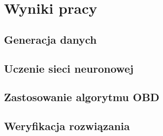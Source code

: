 \newpage %
\section{Wyniki pracy}

\subsection{Generacja danych}
\subsection{Uczenie sieci neuronowej}
\subsection{Zastosowanie algorytmu OBD}
\subsection{Weryfikacja rozwiązania}